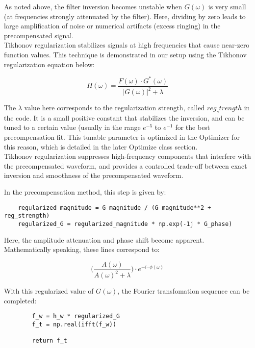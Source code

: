 As noted above, the filter inversion becomes unstable when $G(\omega)$ is very small (at frequencies strongly attenuated by the filter). Here, dividing by zero leads to large amplification of noise or numerical artifacts (excess ringing) in the precompensated signal.
\\
Tikhonov regularization stabilizes signals at high frequencies that cause near-zero function values. This technique is demonstrated in our setup using the Tikhonov regularization equation below:

\begin{equation}
    H(\omega) = \dfrac{F(\omega) \cdot G^*(\omega)}{|G(\omega)|^2 + \lambda}
\end{equation}

The $\lambda$ value here corresponds to the regularization strength, called $reg_strength$ in the code. It is a small positive constant that stabilizes the inversion, and can be tuned to a certain value (usually in the range $e^{-5}$ to $e^{-1}$ for the best precompensation fit. This tunable parameter is optimized in the Optimizer for this reason, which is detailed in the later Optimize class section.
\\
Tikhonov regularization suppresses high-frequency components that interfere with the precompensated waveform, and provides a controlled trade-off between exact inversion and smoothness of the precompensated waveform.

In the precompensation method, this step is given by:

\begin{verbatim}
    regularized_magnitude = G_magnitude / (G_magnitude**2 + reg_strength)
    regularized_G = regularized_magnitude * np.exp(-1j * G_phase)
\end{verbatim}

Here, the amplitude attenuation and phase shift become apparent. Mathematically speaking, these lines correspond to:

\begin{equation}
    \biggr( \dfrac{A(\omega)}{A(\omega)^2 + \lambda} \biggr) \cdot e^{-i \cdot \phi(\omega)}
\end{equation}

With this regularized value of $G(\omega)$, the Fourier transfomation sequence can be completed:

\begin{verbatim}
        f_w = h_w * regularized_G
        f_t = np.real(ifft(f_w))

        return f_t
\end{verbatim}


